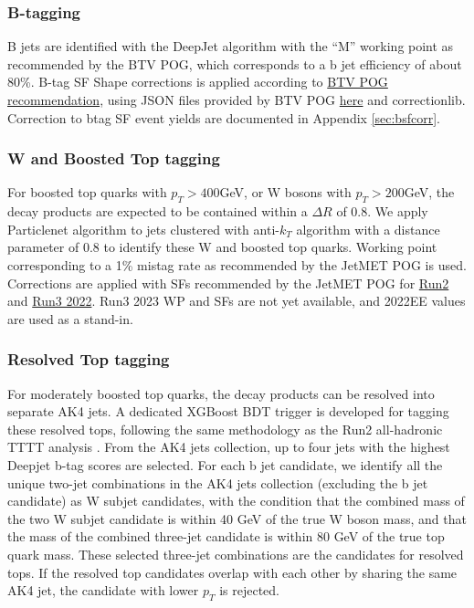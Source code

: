 \documentclass[twoside]{article}
\begin{document}
\subsubsection{B-tagging}

B jets are identified with the DeepJet algorithm with the ``M'' working point as recommended by the BTV POG, which corresponds to a b jet efficiency of about 80\%. B-tag SF Shape corrections is applied according to \href{https://btv-wiki.docs.cern.ch/PerformanceCalibration/shapeCorrectionSFRecommendations/}{BTV POG recommendation}, using JSON files provided by BTV POG \href{https://gitlab.cern.ch/cms-nanoAOD/jsonpog-integration/-/tree/master/POG/BTV}{here} and correctionlib. Correction to btag SF event yields are documented in Appendix \ref{sec:bsfcorr}.

\subsubsection{W and Boosted Top tagging}

For boosted top quarks with $p_T > 400$GeV, or W bosons with $p_T > 200$GeV, the decay products are expected to be contained within a $\Delta R $ of 0.8. We apply Particlenet algorithm to jets clustered with anti-$k_T$ algorithm with a distance parameter of 0.8 to identify these W and boosted top quarks. Working point corresponding to a 1\% mistag rate as recommended by the JetMET POG is used. Corrections are applied with SFs recommended by the JetMET POG for \href{https://twiki.cern.ch/twiki/bin/view/CMS/ParticleNetSFs}{Run2} and \href{https://indico.cern.ch/event/1459087/#20-update-on-topw-particlenet}{Run3 2022}. Run3 2023 WP and SFs are not yet available, and 2022EE values are used as a stand-in.

\subsubsection{Resolved Top tagging}
\label{sec:restop}

For moderately boosted top quarks, the decay products can be resolved into separate AK4 jets. A dedicated XGBoost BDT trigger is developed for tagging these resolved tops, following the same methodology as the Run2 all-hadronic TTTT analysis \cite{prev_ftop_analysis}. From the AK4 jets collection, up to four jets with the highest Deepjet b-tag scores are selected. For each b jet candidate, we identify all the unique two-jet combinations in the AK4 jets collection (excluding the b jet candidate) as  W subjet candidates, with the condition that the combined mass of the two W subjet candidate is within 40 GeV of the true W boson mass, and that the mass of the combined three-jet candidate is within 80 GeV of the true top quark mass. These selected three-jet combinations are the candidates for resolved tops. If the resolved top candidates overlap with each other by sharing the same AK4 jet, the candidate with lower $p_T$ is rejected.
\end{document}
